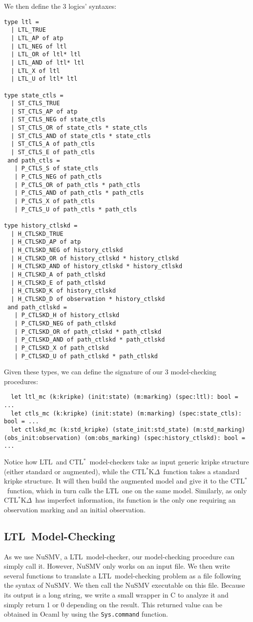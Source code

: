 \documentclass{acmart}
\def\ctls{CTL$^{*}$}
\def\ctlskd{CTL$^{*}$K$\Delta$}
\def\ltl{LTL}
\begin{document}
We then define the 3 logics' syntaxes:
\begin{lstlisting}
type ltl =
  | LTL_TRUE
  | LTL_AP of atp
  | LTL_NEG of ltl
  | LTL_OR of ltl* ltl
  | LTL_AND of ltl* ltl
  | LTL_X of ltl
  | LTL_U of ltl* ltl

type state_ctls =
  | ST_CTLS_TRUE
  | ST_CTLS_AP of atp
  | ST_CTLS_NEG of state_ctls
  | ST_CTLS_OR of state_ctls * state_ctls
  | ST_CTLS_AND of state_ctls * state_ctls
  | ST_CTLS_A of path_ctls
  | ST_CTLS_E of path_ctls
 and path_ctls =
   | P_CTLS_S of state_ctls
   | P_CTLS_NEG of path_ctls
   | P_CTLS_OR of path_ctls * path_ctls
   | P_CTLS_AND of path_ctls * path_ctls
   | P_CTLS_X of path_ctls
   | P_CTLS_U of path_ctls * path_ctls

type history_ctlskd =
  | H_CTLSKD_TRUE
  | H_CTLSKD_AP of atp
  | H_CTLSKD_NEG of history_ctlskd
  | H_CTLSKD_OR of history_ctlskd * history_ctlskd
  | H_CTLSKD_AND of history_ctlskd * history_ctlskd
  | H_CTLSKD_A of path_ctlskd
  | H_CTLSKD_E of path_ctlskd
  | H_CTLSKD_K of history_ctlskd
  | H_CTLSKD_D of observation * history_ctlskd
 and path_ctlskd =
   | P_CTLSKD_H of history_ctlskd
   | P_CTLSKD_NEG of path_ctlskd
   | P_CTLSKD_OR of path_ctlskd * path_ctlskd
   | P_CTLSKD_AND of path_ctlskd * path_ctlskd
   | P_CTLSKD_X of path_ctlskd
   | P_CTLSKD_U of path_ctlskd * path_ctlskd
\end{lstlisting}


Given these types, we can define the signature of our 3 model-checking procedures:

\begin{lstlisting}
  let ltl_mc (k:kripke) (init:state) (m:marking) (spec:ltl): bool = ...
  let ctls_mc (k:kripke) (init:state) (m:marking) (spec:state_ctls): bool = ...
  let ctlskd_mc (k:std_kripke) (state_init:std_state) (m:std_marking) (obs_init:observation) (om:obs_marking) (spec:history_ctlskd): bool = ...
\end{lstlisting}

Notice how \ltl\ and \ctls\ model-checkers take as input generic kripke structure (either standard or augmented), while the \ctlskd\ function takes a standard kripke structure. It will then build the augmented model and give it to the \ctls\ function, which in turn calls the \ltl\ one on the same model.
Similarly, as only \ctlskd\ has imperfect information, its function is the only one requiring an observation marking and an initial observation.

\subsection{\ltl\ Model-Checking}
As we use NuSMV, a \ltl\ model-checker, our model-checking procedure can simply call it.
However, NuSMV only works on an input file. We then write several functions to translate a \ltl\ model-checking problem as a file following the syntax of NuSMV.
We then call the NuSMV executable on this file. Because its output is a long string, we write a small wrapper in C to analyze it and simply return 1 or 0 depending on the result. This returned value can be obtained in Ocaml by using the \texttt{Sys.command} function.
\end{document}
